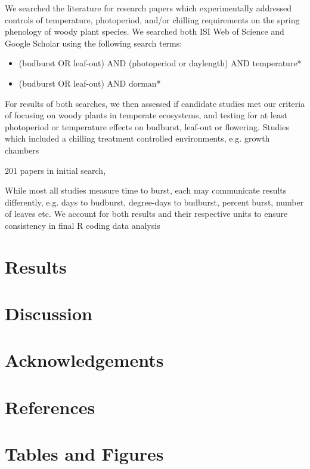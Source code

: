 \documentclass[11pt]{article}
\begin{document}
We searched the literature for research papers which experimentally addressed controls of temperature, photoperiod, and/or chilling requirements on the spring phenology of woody plant species. We searched both ISI Web of Science and Google Scholar using the following search terms:
\begin{itemize}
\item{ (budburst OR leaf-out) AND (photoperiod or daylength) AND temperature* }
\item{ (budburst OR leaf-out) AND dorman*  }
\end{itemize}

For results of both searches, we then assessed if candidate studies met our criteria of focusing on woody plants in temperate ecosystems, and testing for at least photoperiod or temperature effects on budburst, leaf-out or flowering. Studies which included a chilling treatment 
 controlled environments, e.g. growth chambers
 
 201 papers in initial search, 
 
 While most all studies measure time to burst, each may communicate results differently, e.g. days to budburst, degree-days to budburst, percent burst, number of leaves etc.
We account for both results and their respective units to ensure consistency in final R coding data analysis



\section*{Results}

\section*{Discussion}

\section*{Acknowledgements}

\section*{References}

\section*{Tables and Figures}
\end{document}
